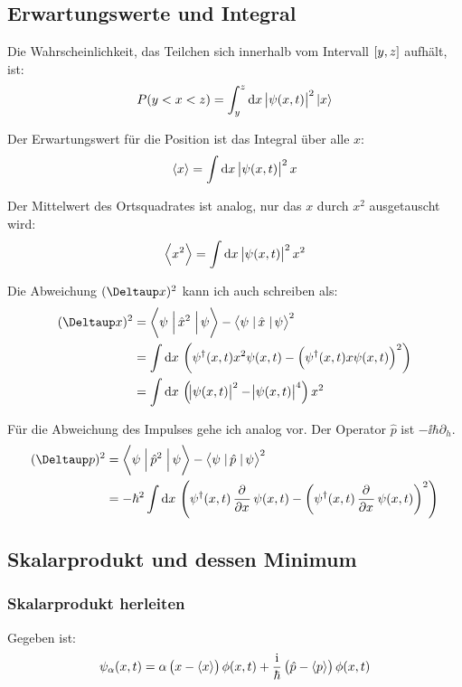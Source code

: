 \subsection{Erwartungswerte und Integral}

Die Wahrscheinlichkeit, das Teilchen sich innerhalb vom Intervall $\intcc{y,
z}$ aufhält, ist:
\[
	P(y < x < z) = \int_y^z \dif x \, \abs{\psi(x, t)}^2 \ket x
\]

Der Erwartungswert für die Position ist das Integral über alle $x$:
\[
	\bracket x = \int\dif x \, \abs{\psi(x, t)}^2 x
\]

Der Mittelwert des Ortsquadrates ist analog, nur das $x$ durch $x^2$
ausgetauscht wird:
\[
	\bracket{x^2} = \int\dif x \, \abs{\psi(x, t)}^2 x^2
\]

Die Abweichung $(\Deltaup x)^2$ kann ich auch schreiben als:
\cite{wikipedia-quantum_operators}
\begin{align*}
	(\Deltaup x)^2
	&= \braproket{\psi}{\hat x^2}{\psi} - \braproket{\psi}{\hat x}{\psi}^2 \\
	&= \int \dif x \, \del{\psi^\dagger(x, t) x^2 \psi(x, t) - \del{\psi^\dagger(x, t) x \psi(x, t)}^2} \\
	&= \int \dif x \, \del{\abs{\psi(x, t)}^2 - \abs{\psi(x, t)}^4} x^2
\end{align*}

Für die Abweichung des Impulses gehe ich analog vor. Der Operator $\hat p$ ist
$- \ii \hbar \partial_h$.
\begin{align*}
	(\Deltaup p)^2
	&= \braproket{\psi}{\hat p^2}{\psi} - \braproket{\psi}{\hat p}{\psi}^2 \\
	&= - \hbar^2 \int \dif x \, \del{\psi^\dagger(x, t) \dpd{}x \psi(x, t) - \del{\psi^\dagger(x, t) \dpd{}x \psi(x, t)}^2}
\end{align*}

\subsection{Skalarprodukt und dessen Minimum}

\subsubsection{Skalarprodukt herleiten}

Gegeben ist:
\[
	\psi_\alpha(x, t) = \alpha \del{x - \bracket x} \phi(x, t) + \frac\ii\hbar \del{\hat p - \bracket p} \phi(x, t)
\]

